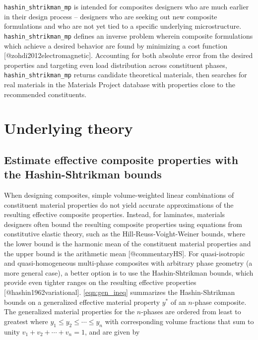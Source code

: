 \texttt{hashin\_shtrikman\_mp} is intended for composites designers who
are much earlier in their design process -- designers who are seeking
out new composite formulations and who are not yet tied to a specific
underlying microstructure. \texttt{hashin\_shtrikman\_mp} defines an
inverse problem wherein composite formulations which achieve a desired
behavior are found by minimizing a cost function
{[}@zohdi2012electromagnetic{]}. Accounting for both absolute error from
the desired properties and targeting even load distribution across
constituent phases, \texttt{hashin\_shtrikman\_mp} returns candidate
theoretical materials, then searches for real materials in the Materials
Project database with properties close to the recommended constituents.

\section{Underlying theory}\label{underlying-theory}

\subsection{Estimate effective composite properties with the
Hashin-Shtrikman
bounds}\label{estimate-effective-composite-properties-with-the-hashin-shtrikman-bounds}

When designing composites, simple volume-weighted linear combinations of
constituent material properties do not yield accurate approximations of
the resulting effective composite properties. Instead, for laminates,
materials designers often bound the resulting composite properties using
equations from constitutive elastic theory, such as the
Hill-Reuss-Voight-Weiner bounds, where the lower bound is the harmonic
mean of the constituent material properties and the upper bound is the
arithmetic mean {[}@commentaryHS{]}. For quasi-isotropic and
quasi-homogeneous multi-phase composites with arbitrary phase geometry
(a more general case), a better option is to use the Hashin-Shtrikman
bounds, which provide even tighter ranges on the resulting effective
properties {[}@hashin1962variational{]}. \autoref{eqn:gen_ineq}
summarizes the Hashin-Shtrikman bounds on a generalized effective
material property \(y^{*}\) of an \(n\)-phase composite. The generalized
material properties for the \(n\)-phases are ordered from least to
greatest where \(y_{1} \leq y_{2} \leq \dotsb \leq y_{n}\) with
corresponding volume fractions that sum to unity
\(v_{1} + v_{2} + \dotsb + v_{n} = 1\), and are given by

